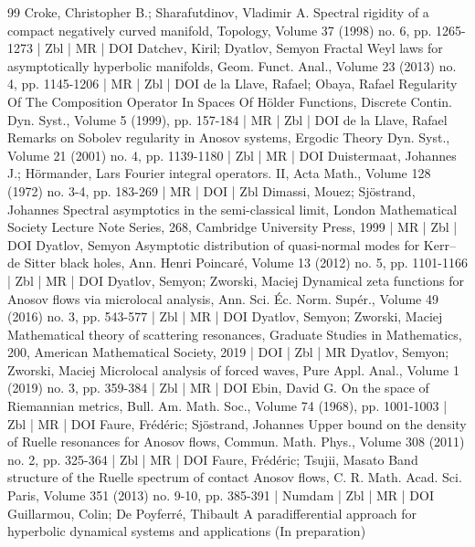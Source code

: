 \documentclass[10pt]{amsart}
\theoremstyle{definition}\newtheorem{defi}[theo]{Definition}\newtheorem{rema}[theo]{Remark}\newtheorem{exam}[theo]{Example}\newtheorem{exem}[theo]{Example}\newtheorem{nota}[theo]{Notation}
\begin{document}
\begin{thebibliography}{99}
Croke, Christopher B.; Sharafutdinov, Vladimir A. Spectral rigidity of a compact negatively curved manifold, Topology, Volume 37 (1998) no. 6, pp. 1265-1273 | Zbl | MR | DOI
Datchev, Kiril; Dyatlov, Semyon Fractal Weyl laws for asymptotically hyperbolic manifolds, Geom. Funct. Anal., Volume 23 (2013) no. 4, pp. 1145-1206 | MR | Zbl | DOI
de la Llave, Rafael; Obaya, Rafael Regularity Of The Composition Operator In Spaces Of Hölder Functions, Discrete Contin. Dyn. Syst., Volume 5 (1999), pp. 157-184 | MR | Zbl | DOI
de la Llave, Rafael Remarks on Sobolev regularity in Anosov systems, Ergodic Theory Dyn. Syst., Volume 21 (2001) no. 4, pp. 1139-1180 | Zbl | MR | DOI
Duistermaat, Johannes J.; Hörmander, Lars Fourier integral operators. II, Acta Math., Volume 128 (1972) no. 3-4, pp. 183-269 | MR | DOI | Zbl
Dimassi, Mouez; Sjöstrand, Johannes Spectral asymptotics in the semi-classical limit, London Mathematical Society Lecture Note Series, 268, Cambridge University Press, 1999 | MR | Zbl | DOI
Dyatlov, Semyon Asymptotic distribution of quasi-normal modes for Kerr–de Sitter black holes, Ann. Henri Poincaré, Volume 13 (2012) no. 5, pp. 1101-1166 | Zbl | MR | DOI
Dyatlov, Semyon; Zworski, Maciej Dynamical zeta functions for Anosov flows via microlocal analysis, Ann. Sci. Éc. Norm. Supér., Volume 49 (2016) no. 3, pp. 543-577 | Zbl | MR | DOI
Dyatlov, Semyon; Zworski, Maciej Mathematical theory of scattering resonances, Graduate Studies in Mathematics, 200, American Mathematical Society, 2019 | DOI | Zbl | MR
Dyatlov, Semyon; Zworski, Maciej Microlocal analysis of forced waves, Pure Appl. Anal., Volume 1 (2019) no. 3, pp. 359-384 | Zbl | MR | DOI
Ebin, David G. On the space of Riemannian metrics, Bull. Am. Math. Soc., Volume 74 (1968), pp. 1001-1003 | Zbl | MR | DOI
Faure, Frédéric; Sjöstrand, Johannes Upper bound on the density of Ruelle resonances for Anosov flows, Commun. Math. Phys., Volume 308 (2011) no. 2, pp. 325-364 | Zbl | MR | DOI
Faure, Frédéric; Tsujii, Masato Band structure of the Ruelle spectrum of contact Anosov flows, C. R. Math. Acad. Sci. Paris, Volume 351 (2013) no. 9-10, pp. 385-391 | Numdam | Zbl | MR | DOI
Guillarmou, Colin; De Poyferré, Thibault A paradifferential approach for hyperbolic dynamical systems and applications (In preparation)

\end{thebibliography}
\end{document}
